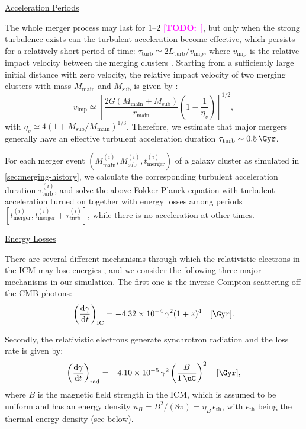 \documentclass[modern]{aastex62}
\newcommand{\R}[1]{\mathrm{#1}}
\newcommand{\D}[1]{\R{d} #1}
\newcommand{\diff}[2]{\frac{\D{#1}}{\D{#2}}}
\newcommand{\TODO}[1]{\textcolor{magenta}{[\textbf{TODO:}~\uuline{#1}]}}
\begin{document}
\vspace{1ex}
\uline{Acceleration Periods}

The whole merger process may last for \SIrange{1}{2}{\Gyr} \TODO{ref???},
but only when the strong turbulence exists can the turbulent acceleration
become effective, which persists for a relatively short period of time:
$\tau_{\R{turb}} \simeq 2 L_{\R{turb}} / v_{\R{imp}}$,
where $v_{\R{imp}}$ is the relative impact velocity between the merging
clusters \citep{miniati2015}.
Starting from a sufficiently large initial distance with zero velocity,
the relative impact velocity of two merging clusters with mass
$M_{\R{main}}$ and $M_{\R{sub}}$ is given by \citep{sarazin2002,cassano2005}:
\begin{equation}
  \label{eq:v-imp}
  v_{\R{imp}} \simeq \left[
    \frac{2G (M_{\R{main}} + M_{\R{sub}})}{r_{\R{main}}}
    \left( 1 - \frac{1}{\eta_v} \right)\right]^{1/2},
\end{equation}
with $\eta_v \simeq 4 (1 + M_{\R{sub}}/M_{\R{main}})^{1/3}$.
Therefore, we estimate that major mergers generally have an effective
turbulent acceleration duration $\tau_{\R{turb}} \sim \SI{0.5}{\Gyr}$.

For each merger event
$(M^{(i)}_{\R{main}}, M^{(i)}_{\R{sub}}, t^{(i)}_{\R{merger}})$
of a galaxy cluster as simulated in \autoref{sec:merging-history},
we calculate the corresponding turbulent acceleration duration
$\tau^{(i)}_{\R{turb}}$, and solve the above Fokker-Planck equation with
turbulent acceleration turned on together with energy losses among
periods $[t^{(i)}_{\R{merger}}, t^{(i)}_{\R{merger}}+\tau^{(i)}_{\R{turb}}]$,
while there is no acceleration at other times.

\vspace{1ex}
\uline{Energy Losses}

There are several different mechanisms through which the relativistic
electrons in the ICM may lose energies \citep{sarazin1999},
and we consider the following three major mechanisms in our simulation.
The first one is the inverse Compton scattering off the CMB photons:
\begin{equation}
  \label{eq:eloss-ic}
  \left( \diff{\gamma}{t} \right)_{\R{IC}} =
    \num{-4.32e-4} \,\gamma^2 (1+z)^4
    \quad [\si{\per\Gyr}].
\end{equation}

Secondly, the relativistic electrons generate synchrotron radiation
and the loss rate is given by:
\begin{equation}
  \label{eq:eloss-syn}
  \left( \diff{\gamma}{t} \right)_{\R{rad}} =
    \num{-4.10e-5} \,\gamma^2 \left( \frac{B}{\SI{1}{\uG}} \right)^2
    \quad [\si{\per\Gyr}],
\end{equation}
where $B$ is the magnetic field strength in the ICM, which is assumed
to be uniform and has an energy density
$u_B = B^2 / (8\pi) = \eta_B \,\epsilon_{\R{th}}$,
with $\epsilon_{\R{th}}$ being the thermal energy density (see below).
\end{document}
